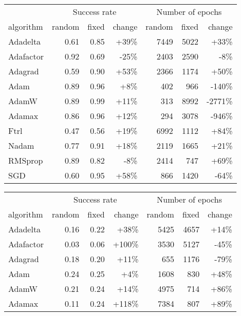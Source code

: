 \documentclass[letterpaper]{article} %
\begin{document}
\begin{table*}[t]
    \centering\fontsize{8}{9.6}\selectfont
    \begin{tabular}{lrrrrrr}
        \toprule
        & \multicolumn{3}{c}{Success rate} & \multicolumn{3}{c}{Number of epochs}
        \\\cmidrule(lr){2-4}\cmidrule(lr){5-7}
        algorithm & random & fixed & change & random & fixed & change
        \\\midrule
        Adadelta & 0.61 & 0.85 & +39\% & 7449 & 5022 & +33\%
        \\
        Adafactor & 0.92 & 0.69 & -25\% & 2403 & 2590 & -8\%
        \\
        Adagrad & 0.59 & 0.90 & +53\% & 2366 & 1174 & +50\%
        \\
        Adam & 0.89 & 0.96 & +8\% & 402 & 966 & -140\%
        \\
        AdamW & 0.89 & 0.99 & +11\% & 313 & 8992 & -2771\%
        \\
        Adamax & 0.86 & 0.96 & +12\% & 294 & 3078 & -946\%
        \\
        Ftrl & 0.47 & 0.56 & +19\% & 6992 & 1112 & +84\%
        \\
        Nadam & 0.77 & 0.91 & +18\% & 2119 & 1665 & +21\%
        \\
        RMSprop & 0.89 & 0.82 & -8\% & 2414 & 747 & +69\%
        \\
        SGD & 0.60 & 0.95 & +58\% & 866 & 1420 & -64\%
        \\\bottomrule
    \end{tabular}
    \hfill
    \begin{tabular}{lrrrrrr}
        \toprule
        & \multicolumn{3}{c}{Success rate} & \multicolumn{3}{c}{Number of epochs}
        \\\cmidrule(lr){2-4}\cmidrule(lr){5-7}
        algorithm & random & fixed & change & random & fixed & change
        \\\midrule
        Adadelta & 0.16 & 0.22 & +38\% & 5425 & 4657 & +14\%
        \\
        Adafactor & 0.03 & 0.06 & +100\% & 3530 & 5127 & -45\%
        \\
        Adagrad & 0.18 & 0.20 & +11\% & 655 & 1176 & -79\%
        \\
        Adam & 0.24 & 0.25 & +4\% & 1608 & 830 & +48\%
        \\
        AdamW & 0.21 & 0.24 & +14\% & 4975 & 714 & +86\%
        \\
        Adamax & 0.11 & 0.24 & +118\% & 7384 & 807 & +89\%

\end{tabular}
\end{table*}
\end{document}
